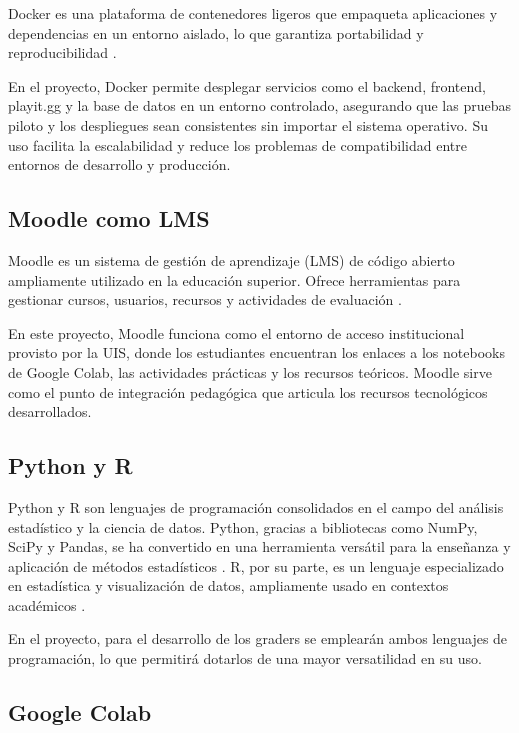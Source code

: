 \documentclass[letter,oneside,12pt,spanish]{report}
\begin{document}
Docker es una plataforma de contenedores ligeros que empaqueta aplicaciones y dependencias en un entorno aislado, lo que garantiza portabilidad y reproducibilidad \parencite{merkel2014}.

En el proyecto, Docker permite desplegar servicios como el backend, frontend, playit.gg y la base de datos en un entorno controlado, asegurando que las pruebas piloto y los despliegues sean consistentes sin importar el sistema operativo. Su uso facilita la escalabilidad y reduce los problemas de compatibilidad entre entornos de desarrollo y producción.

\subsection{Moodle como LMS}

Moodle es un sistema de gestión de aprendizaje (LMS) de código abierto ampliamente utilizado en la educación superior. Ofrece herramientas para gestionar cursos, usuarios, recursos y actividades de evaluación \parencite{dougiamas2003}.

En este proyecto, Moodle funciona como el entorno de acceso institucional provisto por la UIS, donde los estudiantes encuentran los enlaces a los notebooks de Google Colab, las actividades prácticas y los recursos teóricos. Moodle sirve como el punto de integración pedagógica que articula los recursos tecnológicos desarrollados.

\subsection{Python y R}

Python y R son lenguajes de programación consolidados en el campo del análisis estadístico y la ciencia de datos. Python, gracias a bibliotecas como NumPy, SciPy y Pandas, se ha convertido en una herramienta versátil para la enseñanza y aplicación de métodos estadísticos \parencite{mckinney2017}. R, por su parte, es un lenguaje especializado en estadística y visualización de datos, ampliamente usado en contextos académicos \parencite{rcoreteam2023}.

En el proyecto, para el desarrollo de los graders se emplearán ambos lenguajes de programación, lo que permitirá dotarlos de una mayor versatilidad en su uso.

\subsection{Google Colab}
\end{document}
